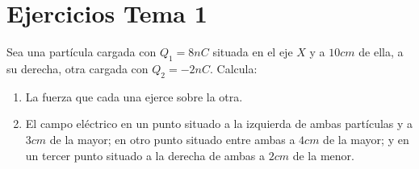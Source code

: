 \restoregeometry    
\section{Ejercicios Tema 1}
\begin{problem}{1.1}
    Sea una partícula cargada con $Q_1 = 8nC$ situada en el eje $X$ y a $10cm$ de ella, a su derecha, otra cargada con $Q_2 = -2nC$. Calcula: 
    \begin{enumerate}
        \item La fuerza que cada una ejerce sobre la otra.
        \item El campo eléctrico en un punto situado a la izquierda de ambas partículas y a $3cm$ de la mayor; en otro punto situado entre ambas a $4cm$ de la mayor; y en un tercer punto situado a la derecha de ambas a $2cm$ de la menor.
    \end{enumerate}
\end{problem}

